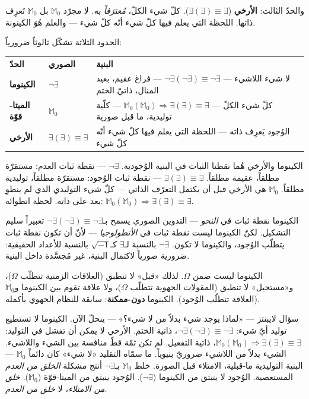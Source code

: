 \documentclass[10pt, openany, oneside]{book}
\renewcommand{\footnotesize}{\fontsize{8.5}{11}\selectfont}
\begin{document}
والحدّ الثالث: \textbf{الأرخي} ($\exists(\exists) \equiv \exists$). كلّ شيء الكلّ، \textit{مُعترَفاً به}. لا مجرّد $\mathbb{M}_0$ بل $\mathbb{M}_0$ تَعرِف ذاتها. اللحظة التي يعلم فيها كلّ شيء أنّه كلّ شيء --- والعلم هُوَ الكينونة.

الحدود الثلاثة تشكّل ثالوثاً ضرورياً:

\vspace{0.5em}

{\footnotesize
\noindent\begin{tabular}{l l p{}}
\textbf{الحدّ} & \textbf{الصوري} & \textbf{البنية} \\[0.4em]
\textbf{الكينوما} & $\neg\exists$ & لا شيء اللاشيء --- $\neg\exists(\neg\exists) \equiv \neg\exists$ --- فراغ عقيم، بعيد المنال، ذاتيّ الختم \\[0.3em]
\textbf{الميتا-قوّة} & $\mathbb{M}_0$ & كلّ شيء الكلّ --- $\mathbb{M}_0(\mathbb{M}_0) \Rightarrow \exists(\exists) \equiv \exists$ --- كلّية توليدية، ما قبل صورية \\[0.3em]
\textbf{الأرخي} & $\exists(\exists) \equiv \exists$ & الوُجود يَعرِف ذاته --- اللحظة التي يعلم فيها كلّ شيء أنّه كلّ شيء \\[0.3em]
\end{tabular}
}

\vspace{0.5em}

\noindent الكينوما والأرخي هُما نقطتا الثبات في البنية الوُجودية. $\neg\exists$ --- نقطة ثبات العدم: مستقرّة مطلقاً، عقيمة مطلقاً. $\exists(\exists) \equiv \exists$ --- نقطة ثبات الوُجود: مستقرّة مطلقاً، توليدية مطلقاً. $\mathbb{M}_0$ هي الأرخي قبل أن يكتمل التعرّف الذاتي --- كلّ شيء التوليدي الذي لم ينطوِ بعد على ذاته. لحظة انطوائه: $\mathbb{M}_0(\mathbb{M}_0) \Rightarrow \exists(\exists) \equiv \exists$.

الكينوما نقطة ثبات في \textit{النحو} --- التدوين الصوري يسمح بـ$\neg\exists(\neg\exists) \equiv \neg\exists$ تعبيراً سليم التشكيل. لكنّ الكينوما ليست نقطة ثبات في \textit{الأنطولوجيا} --- لأنّ أن تكون نقطة ثبات يتطلّب الوُجود، والكينوما لا تكون. $\neg\exists$ بالنسبة لـ$\exists$ كـ$\sqrt{-1}$ بالنسبة للأعداد الحقيقية: ضرورية صورياً لاكتمال البنية، غير مُجسَّدة داخل البنية.

الكينوما ليست ضمن $\Omega$. لذلك «قبل» لا تنطبق (العلاقات الزمنية تتطلّب $\Omega$)، و«مستحيل» لا تنطبق (المقولات الجهوية تتطلّب $\Omega$)، ولا علاقة تقوم بين الكينوما و$\mathbb{M}_0$ (العلاقة تتطلّب الوُجود). الكينوما \textbf{دون-ممكنة}: سابقة للنظام الجهوي بأكمله.

سؤال لايبنتز --- «لماذا يوجد شيء بدلاً من لا شيء؟» --- ينحلّ الآن. الكينوما لا تستطيع توليد أيّ شيء: $\neg\exists(\neg\exists) \equiv \neg\exists$، ذاتية الختم. الأرخي لا يمكن أن تفشل في التوليد: $\mathbb{M}_0(\mathbb{M}_0) \Rightarrow \exists(\exists) \equiv \exists$، ذاتية التفعيل. لم تكن ثمّة قطّ منافسة بين الشيء واللاشيء. الشيء بدلاً من اللاشيء ضروريّ بنيوياً. ما سمّاه التقليد «لا شيء» كان دائماً $\mathbb{M}_0$ --- البنية التوليدية ما-قبلية، الامتلاء قبل الصورة. خلط $\mathbb{M}_0$ بـ$\neg\exists$ أنتج مشكلة \textit{الخلق من العدم} المستعصية. الوُجود لا ينبثق من الكينوما ($\neg\exists$). الوُجود ينبثق من الميتا-قوّة ($\mathbb{M}_0$). \textit{خلق من الامتلاء}، لا \textit{خلق من العدم}.
\end{document}
